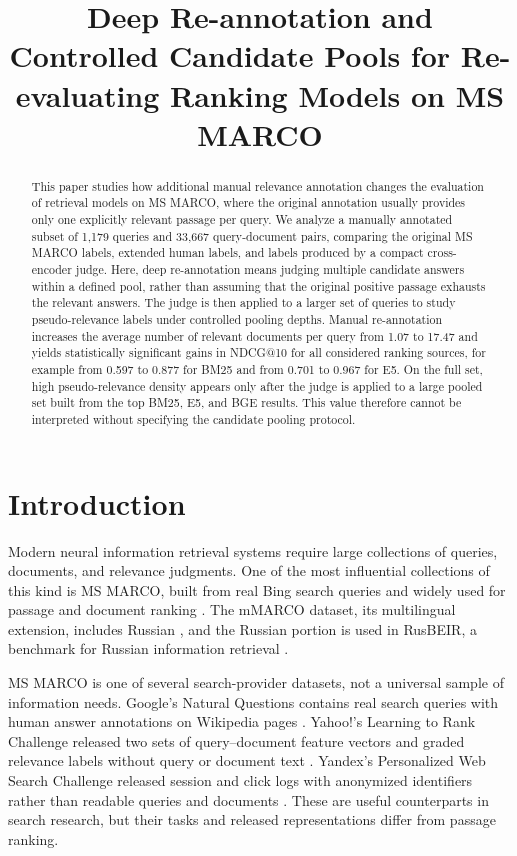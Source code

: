 \documentclass[runningheads,a4paper]{llncs}
\title{Deep Re-annotation and Controlled Candidate Pools for Re-evaluating Ranking Models on MS MARCO}
\author{}
\institute{}
\begin{document}
\maketitle
\begin{abstract}
This paper studies how additional manual relevance annotation changes the evaluation of retrieval models on MS MARCO, where the original annotation usually provides only one explicitly relevant passage per query. We analyze a manually annotated subset of 1,179 queries and 33,667 query-document pairs, comparing the original MS MARCO labels, extended human labels, and labels produced by a compact cross-encoder judge. Here, deep re-annotation means judging multiple candidate answers within a defined pool, rather than assuming that the original positive passage exhausts the relevant answers. The judge is then applied to a larger set of queries to study pseudo-relevance labels under controlled pooling depths. Manual re-annotation increases the average number of relevant documents per query from 1.07 to 17.47 and yields statistically significant gains in NDCG@10 for all considered ranking sources, for example from 0.597 to 0.877 for BM25 and from 0.701 to 0.967 for E5. On the full set, high pseudo-relevance density appears only after the judge is applied to a large pooled set built from the top BM25, E5, and BGE results. This value therefore cannot be interpreted without specifying the candidate pooling protocol.

\end{abstract}

\section{Introduction}

Modern neural information retrieval systems require large collections of queries, documents, and relevance judgments. One of the most influential collections of this kind is MS MARCO, built from real Bing search queries and widely used for passage and document ranking \cite{bajaj2016msmarco}. The mMARCO dataset, its multilingual extension, includes Russian \cite{bonifacio2022mmarco}, and the Russian portion is used in RusBEIR, a benchmark for Russian information retrieval \cite{2025rusbeir}.

MS MARCO is one of several search-provider datasets, not a universal sample of information needs. Google's Natural Questions contains real search queries with human answer annotations on Wikipedia pages \cite{kwiatkowski2019naturalquestions}. Yahoo!'s Learning to Rank Challenge released two sets of query--document feature vectors and graded relevance labels without query or document text \cite{chapelle2011yahoo}. Yandex's Personalized Web Search Challenge released session and click logs with anonymized identifiers rather than readable queries and documents \cite{yandex2013personalized}. These are useful counterparts in search research, but their tasks and released representations differ from passage ranking.
\end{document}
